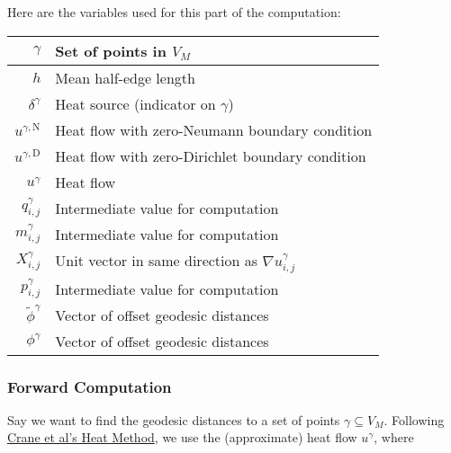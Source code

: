 Here are the variables used for this part of the computation: \begin{center}\begin{tabular}{r|l}
	\(\gamma\) & Set of points in \(V_M\) \\ \hline
	\(h\) & Mean half-edge length \\ \hline
	\(\delta^\gamma\) & Heat source (indicator on \(\gamma\)) \\ \hline
	\(u^{\gamma, \text{N}}\) & Heat flow with zero-Neumann boundary condition \\ \hline
	\(u^{\gamma, \text{D}}\) & Heat flow with zero-Dirichlet boundary condition \\ \hline
	\(u^\gamma\) & Heat flow \\ \hline
	\(q^\gamma_{i, j}\) & Intermediate value for computation \\ \hline
	\(m^\gamma_{i, j}\) & Intermediate value for computation \\ \hline
	\(X^\gamma_{i, j}\) & Unit vector in same direction as \(\nabla u^\gamma_{i, j}\) \\ \hline
	\(p^\gamma_{i, j}\) & Intermediate value for computation \\ \hline
	\(\widetilde{\phi}^\gamma\) & Vector of offset geodesic distances \\ \hline
	\(\phi^\gamma\) & Vector of offset geodesic distances
\end{tabular}\end{center}

\subsubsection{Forward Computation}

Say we want to find the geodesic distances to a set of points \(\gamma \subseteq V_M\). Following \href{https://www.cs.cmu.edu/~kmcrane/Projects/HeatMethod/}{Crane et al's Heat Method}, we use the (approximate) heat flow \(u^\gamma\), where

